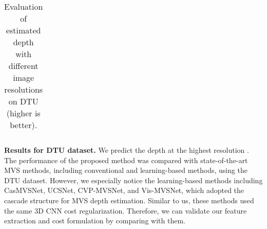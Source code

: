 \documentclass{article} \usepackage{iclr2022_conference,times}
\begin{document}
\begin{table}[!t]
\begin{minipage}[t]{.5\textwidth}
{\begin{tabular}{|L{20em} | C{3.4em} C{3.4em} C{3.4em} |}
\end{tabular}
}
\end{minipage}
\quad
\begin{minipage}[t]{.48\textwidth}
\caption{Evaluation of estimated depth with different image resolutions on DTU (higher is better).}
\label{table2}
\centering
{}
\end{minipage}
\end{table}
\textbf{Results for DTU dataset.} We predict the depth at the highest resolution . The performance of the proposed method was compared with state-of-the-art MVS methods, including conventional and learning-based methods, using the DTU dataset. However, we especially notice the learning-based methods including CasMVSNet, UCSNet, CVP-MVSNet, and Vis-MVSNet, which adopted the cascade structure for MVS depth estimation. Similar to us, these methods used the same 3D CNN cost regularization. Therefore, we can validate our feature extraction and cost formulation by comparing with them. 
\end{document}
